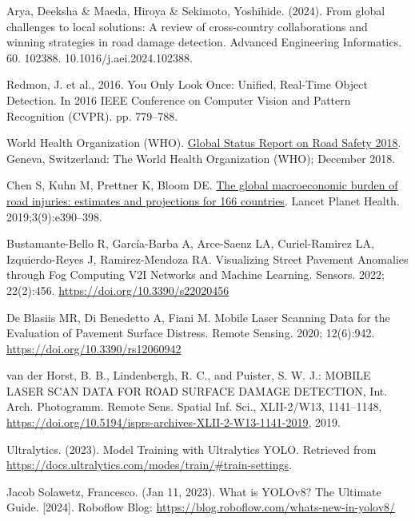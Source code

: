 \begin{thebibliography}{10}
        Arya, Deeksha \& Maeda, Hiroya \& Sekimoto, Yoshihide. (2024). From global challenges to local solutions: A review of cross-country collaborations and winning strategies in road damage detection. Advanced Engineering Informatics. 60. 102388. 10.1016/j.aei.2024.102388. 

        Redmon, J. et al., 2016. You Only Look Once: Unified, Real-Time Object Detection. In 2016 IEEE Conference on Computer Vision and Pattern Recognition (CVPR). pp. 779–788.

        World Health Organization (WHO). \href{https://www.who.int/publications/i/item/9789241565684}{Global Status Report on Road Safety 2018}. Geneva, Switzerland: The World Health Organization (WHO); December 2018.
        
        Chen S, Kuhn M, Prettner K, Bloom DE. \href{https://www.sciencedirect.com/science/article/pii/S2542519619301706}{The global macroeconomic burden of road injuries: estimates and projections for 166 countries}. Lancet Planet Health. 2019;3(9):e390–398.

        Bustamante-Bello R, García-Barba A, Arce-Saenz LA, Curiel-Ramirez LA, Izquierdo-Reyes J, Ramirez-Mendoza RA. Visualizing Street Pavement Anomalies through Fog Computing V2I Networks and Machine Learning. Sensors. 2022; 22(2):456. \url{https://doi.org/10.3390/s22020456}

        De Blasiis MR, Di Benedetto A, Fiani M. Mobile Laser Scanning Data for the Evaluation of Pavement Surface Distress. Remote Sensing. 2020; 12(6):942. \url{https://doi.org/10.3390/rs12060942}

        van der Horst, B. B., Lindenbergh, R. C., and Puister, S. W. J.: MOBILE LASER SCAN DATA FOR ROAD SURFACE DAMAGE DETECTION, Int. Arch. Photogramm. Remote Sens. Spatial Inf. Sci., XLII-2/W13, 1141–1148, \url{https://doi.org/10.5194/isprs-archives-XLII-2-W13-1141-2019}, 2019.

        Ultralytics. (2023). Model Training with Ultralytics YOLO.
        Retrieved from \url{https://docs.ultralytics.com/modes/train/#train-settings}.

        Jacob Solawetz, Francesco. (Jan 11, 2023). What is YOLOv8? The Ultimate Guide. [2024]. Roboflow Blog: \url{https://blog.roboflow.com/whats-new-in-yolov8/}


\end{thebibliography}
